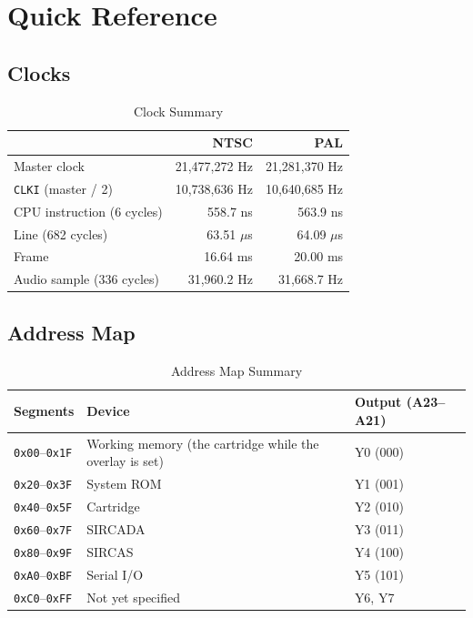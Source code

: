 \chapter{Quick Reference}
\label{app:quick-reference}

\section{Clocks}

\begin{table}[H]
	\centering
	\begin{tabular}{lrr}
		\toprule
		                           & \textbf{NTSC} & \textbf{PAL}  \\
		\midrule
		Master clock               & 21,477,272 Hz & 21,281,370 Hz \\
		\texttt{CLKI} (master / 2) & 10,738,636 Hz & 10,640,685 Hz \\
		CPU instruction (6 cycles) & 558.7 ns      & 563.9 ns      \\
		Line (682 cycles)          & 63.51 $\mu$s  & 64.09 $\mu$s  \\
		Frame                      & 16.64 ms      & 20.00 ms      \\
		Audio sample (336 cycles)  & 31,960.2 Hz   & 31,668.7 Hz   \\
		\bottomrule
	\end{tabular}
	\caption{Clock Summary}
\end{table}

\section{Address Map}

\begin{table}[H]
	\centering
	\begin{tabular}{lll}
		\toprule
		\textbf{Segments}            & \textbf{Device}                                         & \textbf{Output (A23--A21)} \\
		\midrule
		\texttt{0x00}--\texttt{0x1F} & Working memory (the cartridge while the overlay is set) & Y0 (000)                   \\
		\texttt{0x20}--\texttt{0x3F} & System ROM                                              & Y1 (001)                   \\
		\texttt{0x40}--\texttt{0x5F} & Cartridge                                               & Y2 (010)                   \\
		\texttt{0x60}--\texttt{0x7F} & SIRCADA                                                 & Y3 (011)                   \\
		\texttt{0x80}--\texttt{0x9F} & SIRCAS                                                  & Y4 (100)                   \\
		\texttt{0xA0}--\texttt{0xBF} & Serial I/O                                              & Y5 (101)                   \\
		\texttt{0xC0}--\texttt{0xFF} & Not yet specified                                       & Y6, Y7                     \\
		\bottomrule
	\end{tabular}
	\caption{Address Map Summary}
\end{table}

